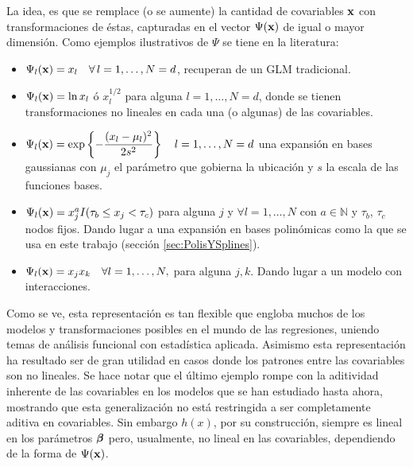 \documentclass[../Main/Main.tex]{subfiles}
\begin{document}
La idea, es que se remplace (o se aumente) la cantidad de covariables $\mathbf{x}$ con transformaciones de éstas, capturadas en el vector $\Psi(\mathbf{x})$ de igual o mayor dimensión. Como ejemplos ilustrativos de $\Psi$ se tiene en la literatura:
\begin{itemize}[label = {}]
	\item $\Psi_l(\mathbf{x}) = x_l \quad \forall\,l = 1,\ldots, N = d$,  recuperan de un GLM tradicional.
	\item $\Psi_l(\mathbf{x}) = \ln x_l$ ó $x^{1/2}_l$ para alguna $l = 1,\ldots, N = d$, donde se tienen transformaciones no lineales en cada una (o algunas) de las covariables.
	\item $\Psi_l(\mathbf{x}) = \exp\left\{-\dfrac{(x_l - \mu_l)^2}{2s^2}\right\} \quad l = 1,\ldots,N = d$ una expansión en bases gaussianas con $\mu_j$ el parámetro que gobierna la ubicación y $s$ la escala de las funciones bases.
	\item $\Psi_l(\mathbf{x}) = x_j^aI( \tau_b \leq x_j <  \tau_c)$ para alguna $j$ y $\forall l =1,\ldots,N$ con $a\in \mathbb{N}$ y $\tau_b$, $\tau_c$ nodos fijos. Dando lugar a  una expansión en bases polinómicas como la que se usa en este trabajo (sección \ref{sec:PolisYSplines}).
	\item $\Psi_l(\mathbf{x}) = x_jx_k  \quad \forall l = 1,\ldots,N,$  para alguna $j,k$. Dando lugar a un modelo con interacciones. 
\end{itemize}

Como se ve, esta representación es tan flexible que engloba muchos de los modelos y transformaciones posibles en el mundo de las regresiones, uniendo temas de análisis funcional con estadística aplicada. Asimismo esta representación ha resultado ser de gran utilidad en casos donde los patrones entre las covariables son no lineales. Se hace notar que el último ejemplo rompe con la aditividad inherente de las covariables en los modelos que se han estudiado hasta ahora, mostrando que esta generalización no está restringida a ser completamente aditiva en covariables. Sin embargo $h(x)$, por su construcción, siempre es lineal en los parámetros $\bm{\beta}$ pero, usualmente, no lineal en las covariables, dependiendo de la forma de $\Psi(\mathbf{x})$.
\end{document}
